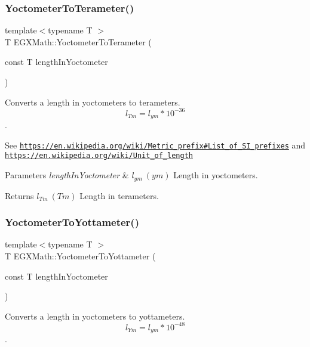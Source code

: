 \subsubsection{\texorpdfstring{Yoctometer\+To\+Terameter()}{YoctometerToTerameter()}}
{\footnotesize\ttfamily template$<$typename T $>$ \\
T E\+G\+X\+Math\+::\+Yoctometer\+To\+Terameter (\begin{DoxyParamCaption}\item[{const T}]{length\+In\+Yoctometer }\end{DoxyParamCaption})}



Converts a length in yoctometers to terameters. \[ l_{Tm}=l_{ym} * 10^{-36} \]. 

See \href{https://en.wikipedia.org/wiki/Metric_prefix#List_of_SI_prefixes}{\tt https\+://en.\+wikipedia.\+org/wiki/\+Metric\+\_\+prefix\#\+List\+\_\+of\+\_\+\+S\+I\+\_\+prefixes} and \href{https://en.wikipedia.org/wiki/Unit_of_length}{\tt https\+://en.\+wikipedia.\+org/wiki/\+Unit\+\_\+of\+\_\+length} 
\begin{DoxyParams}{Parameters}
{\em length\+In\+Yoctometer} & $ l_{ym}\ (ym)$ Length in yoctometers. \\
\hline
\end{DoxyParams}
\begin{DoxyReturn}{Returns}
$ l_{Tm}\ (Tm)$ Length in terameters. 
\end{DoxyReturn}
\mbox{\label{group___e_g_x_math-_conversions-_length_conversions-_yoctometer-_s_i_ga6b9cdc15eb83cf15afe2a52430c84dc0}} 
\subsubsection{\texorpdfstring{Yoctometer\+To\+Yottameter()}{YoctometerToYottameter()}}
{\footnotesize\ttfamily template$<$typename T $>$ \\
T E\+G\+X\+Math\+::\+Yoctometer\+To\+Yottameter (\begin{DoxyParamCaption}\item[{const T}]{length\+In\+Yoctometer }\end{DoxyParamCaption})}



Converts a length in yoctometers to yottameters. \[ l_{Ym}=l_{ym} * 10^{-48} \]. 


